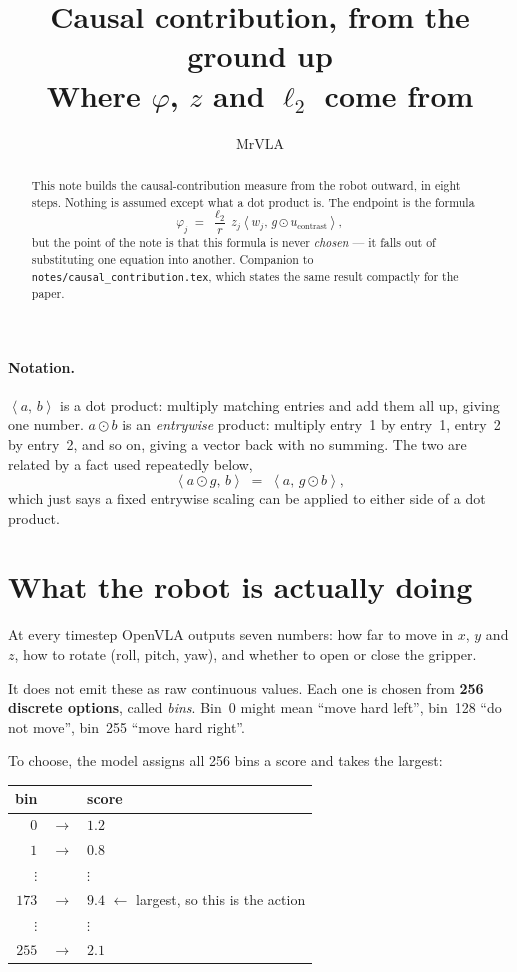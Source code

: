 \documentclass[11pt]{article}
\title{Causal contribution, from the ground up\\[2pt]
       \large Where $\varphi$, $z$ and $\ell_2$ come from}
\author{MrVLA}
\date{}
\newcommand{\dotp}[2]{\left\langle #1,\, #2 \right\rangle}
\newcommand{\ucon}{u_{\mathrm{contrast}}}
\begin{document}
\maketitle

\begin{abstract}
\noindent
This note builds the causal-contribution measure from the robot outward, in eight steps.
Nothing is assumed except what a dot product is. The endpoint is the formula
\[
\varphi_j \;=\; \frac{\ell_2}{r}\, z_j \dotp{w_j}{g \odot \ucon},
\]
but the point of the note is that this formula is never \emph{chosen} --- it falls out of
substituting one equation into another. Companion to
\texttt{notes/causal\_contribution.tex}, which states the same result compactly for the paper.
\end{abstract}

\paragraph{Notation.} $\dotp{a}{b}$ is a dot product: multiply matching entries and add them
all up, giving one number. $a \odot b$ is an \emph{entrywise} product: multiply entry~1 by
entry~1, entry~2 by entry~2, and so on, giving a vector back with no summing. The two are
related by a fact used repeatedly below,
\begin{equation}
\dotp{a \odot g}{b} \;=\; \dotp{a}{g \odot b},
\label{eq:move}
\end{equation}
which just says a fixed entrywise scaling can be applied to either side of a dot product.

\section{What the robot is actually doing}
\label{sec:robot}

At every timestep OpenVLA outputs seven numbers: how far to move in $x$, $y$ and $z$, how to
rotate (roll, pitch, yaw), and whether to open or close the gripper.

It does not emit these as raw continuous values. Each one is chosen from \textbf{256 discrete
options}, called \emph{bins}. Bin~0 might mean ``move hard left'', bin~128 ``do not move'',
bin~255 ``move hard right''.

To choose, the model assigns all 256 bins a score and takes the largest:
\begin{center}
\begin{tabular}{@{}rcl@{}}
\toprule
bin & & score \\
\midrule
$0$   & $\rightarrow$ & $1.2$ \\
$1$   & $\rightarrow$ & $0.8$ \\
$\vdots$ & & $\vdots$ \\
$173$ & $\rightarrow$ & $\mathbf{9.4}$ \quad $\leftarrow$ largest, so this is the action \\
$\vdots$ & & $\vdots$ \\
$255$ & $\rightarrow$ & $2.1$ \\
\bottomrule
\end{tabular}
\end{center}
\end{document}
